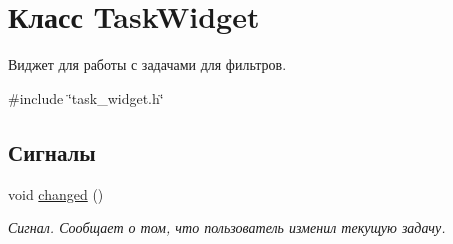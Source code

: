\hypertarget{class_task_widget}{}\section{Класс Task\+Widget}
\label{class_task_widget}


Виджет для работы с задачами для фильтров.  




{\ttfamily \#include \char`\"{}task\+\_\+widget.\+h\char`\"{}}

\subsection*{Сигналы}
\begin{DoxyCompactItemize}
\item 
void \hyperlink{class_task_widget_a881ad67de3b3b2171820b7068fc97714}{changed} ()\hypertarget{class_task_widget_a881ad67de3b3b2171820b7068fc97714}{}\label{class_task_widget_a881ad67de3b3b2171820b7068fc97714}

\begin{DoxyCompactList}\small\item\em Сигнал. Сообщает о том, что пользователь изменил текущую задачу. \end{DoxyCompactList}\end{DoxyCompactItemize}
